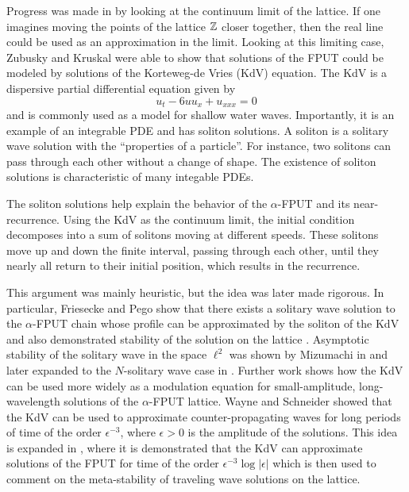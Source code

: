 Progress was made in  \cite{zabusky1965interaction} by looking at the continuum limit of the lattice. If one imagines moving the points of the lattice \(\mathbb{Z}\) closer together, then the real line could be used as an approximation in the limit. Looking at this limiting case, Zubusky and Kruskal were able to show that solutions of the FPUT could be modeled by solutions of the Korteweg-de Vries (KdV) equation. The KdV is a dispersive partial differential equation given by 
\begin{equation}\label{kdv}
	u_t  - 6 u u_x  + u_{xxx}= 0
\end{equation}
and is commonly used as a model for shallow water waves. Importantly, it is an example of an integrable PDE and has soliton solutions. A soliton is a solitary wave solution with the ``properties of a particle''. For instance, two solitons can pass through each other without a change of shape. The existence of soliton solutions is characteristic of many integable PDEs.

The soliton solutions help explain the behavior of the \(\alpha\)-FPUT and its near-recurrence. Using the KdV as the continuum limit, the initial condition decomposes into a sum of solitons moving at different speeds. These solitons move up and down the finite interval, passing through each other, until they nearly all return to their initial position, which results in the recurrence. 

This argument was mainly heuristic, but the idea was later made rigorous. In particular, Friesecke and Pego show that there exists a solitary wave solution to the \(\alpha\)-FPUT chain whose profile can be approximated by the soliton of the KdV and also demonstrated stability of the solution on the lattice \cite{friesecke1999solitary,friesecke2002solitary,friesecke2003solitary,friesecke2004solitary}. Asymptotic stability of the solitary wave in the space \(\ell^2\) was shown by Mizumachi in \cite{mizumachi2009asymptotic} and later expanded to the \(N\)-solitary wave case in \cite{mizumachi2013asymptotic}. Further work shows how the KdV can be used more widely as a modulation equation for small-amplitude, long-wavelength solutions of the \(\alpha\)-FPUT lattice. Wayne and Schneider showed that the KdV can be used to approximate counter-propagating waves for long periods of time \cite{schneider2000counter} of the order \(\epsilon^{-3}\), where \(\epsilon > 0\) is the amplitude of the solutions. This idea is expanded in \cite{khan2017long}, where it is demonstrated that the KdV can approximate solutions of the FPUT for time of the order \(\epsilon^{-3}\log |\epsilon|\) which is then used to comment on the meta-stability of traveling wave solutions on the lattice. 

